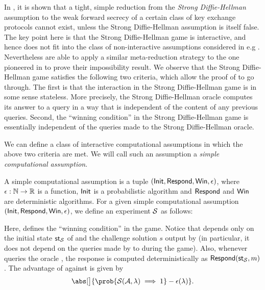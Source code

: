 In , it is shown that a tight, simple reduction from the \emph{Strong Diffie-Hellman} assumption
to the weak forward secrecy of a certain class of key exchange protocols cannot exist,
unless the Strong Diffie-Hellman assumption is itself false.
The key point here is that the Strong Diffie-Hellman game is interactive,
and hence does not fit into the class of non-interactive assumptions considered in e.g .
Nevertheless  are able to apply a similar meta-reduction strategy
to the one pioneered in  to prove their impossibility result.
We observe that the Strong Diffie-Hellman game satisfies the following two criteria,
which allow the proof of  to go through.
The first is that the interaction in the Strong Diffie-Hellman game is in some sense stateless.
More precisely, the Strong Diffie-Hellman oracle computes its answer to a query
in a way that is independent of the content of any previous queries.
Second, the ``winning condition'' in the Strong Diffie-Hellman game is essentially independent of
the queries made to the Strong Diffie-Hellman oracle.

We can define a class of interactive computational assumptions in which the above two criteria are met.
We will call such an assumption a \emph{simple computational assumption}.

\begin{definition}
  A simple computational assumption is a tuple \((\mathsf{Init},\mathsf{Respond},\mathsf{Win},\epsilon)\),
  where \(\epsilon : \mathbb{N} \to \mathbb{R}\) is a function,
  \(\mathsf{Init}\) is a probabilistic algorithm
  and \(\mathsf{Respond}\) and \(\mathsf{Win}\) are deterministic algorithms.
  For a given simple computational assumption \((\mathsf{Init},\mathsf{Respond},\mathsf{Win},\epsilon)\),
  we define an experiment \(\mathcal{S}\) as follows:

  \begin{pchstack}[center,space=0.5cm]
  \end{pchstack}

  Here, \Win{} defines the ``winning condition'' in the game.
  Notice that \Win{} depends only on the initial state \(\mathsf{st}_{\mathcal{S}}\)
  of \Simple and the challenge solution \(s\) output by \advA
  (in particular, it does not depend on the queries made by \advA
  to \oracle during the game).
  Also, whenever \advA queries the oracle \oracle,
  the response is computed deterministically as \(\mathsf{Respond}(\mathsf{st}_{\mathcal{S}},m)\).
  The advantage of \advA{} against \Simple is given by
  \begin{equation}
    \abs[\big]{\prob{\Simple{}(\advA,\lambda) \implies 1} - \epsilon(\lambda)}.
  \end{equation}
\end{definition}


